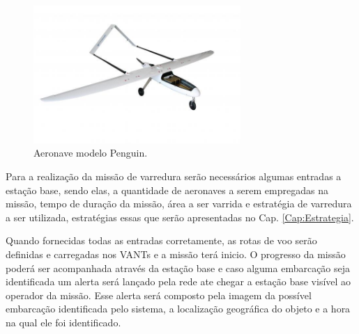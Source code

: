 \begin{figure} 
\center
\includegraphics[width=0.7\textwidth]{penguin.jpg}
\caption{Aeronave modelo Penguin.} 
\label{fig:penguin}
\end{figure}

Para a realização da missão de varredura serão necessários algumas entradas a estação base, sendo elas, a quantidade de aeronaves a serem empregadas na missão, tempo de duração da missão, área a ser varrida e estratégia de varredura a ser utilizada, estratégias essas que serão apresentadas no Cap. \ref{Cap:Estrategia}.

Quando fornecidas todas as entradas corretamente, as rotas de voo serão definidas e carregadas nos VANTs e a missão terá inicio. O progresso da missão poderá ser acompanhada através da estação base e caso alguma embarcação seja identificada um alerta será lançado pela rede ate chegar a estação base visível ao operador da missão. Esse alerta será composto pela imagem da possível embarcação identificada pelo sistema, a localização geográfica do objeto e a hora na qual ele foi identificado.  






 
